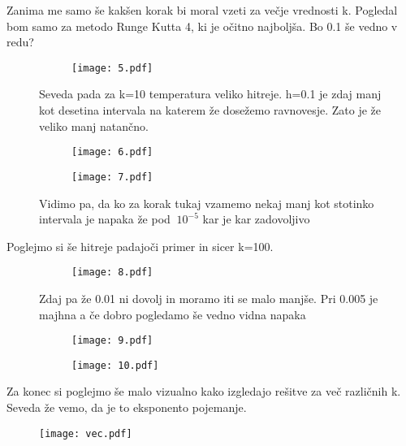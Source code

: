 \documentclass{article}
\begin{document}
Zanima me samo še kakšen korak bi moral vzeti za večje vrednosti k. Pogledal bom samo za metodo Runge Kutta 4, ki je očitno najboljša. Bo 0.1 še vedno v redu?

\begin{figure}[H]
\centering
\begin{subfigure}{.5\textwidth}
\texttt{[image: 5.pdf]}
\end{subfigure}
\caption*{Seveda pada za k=10 temperatura veliko hitreje. h=0.1 je zdaj manj kot desetina intervala na katerem že dosežemo ravnovesje. Zato je že veliko manj natančno. }
\end{figure}

\begin{figure}[H]
\begin{subfigure}{.5\textwidth}
\texttt{[image: 6.pdf]}
\end{subfigure}
\begin{subfigure}{.5\textwidth}
\texttt{[image: 7.pdf]}
\end{subfigure}
\caption*{Vidimo pa, da ko za korak tukaj vzamemo nekaj manj kot stotinko intervala je napaka že pod $~10^{-5}$ kar je kar zadovoljivo}
\end{figure}

Poglejmo si še hitreje padajoči primer in sicer k=100.

\begin{figure}[H]
\centering
\begin{subfigure}{.5\textwidth}
\texttt{[image: 8.pdf]}
\end{subfigure}
\caption*{Zdaj pa že 0.01 ni dovolj in moramo iti se malo manjše. Pri 0.005 je majhna a če dobro pogledamo še vedno vidna napaka}
\end{figure} 


\begin{figure}[H]
\begin{subfigure}{.5\textwidth}
\texttt{[image: 9.pdf]}
\end{subfigure}
\begin{subfigure}{.5\textwidth}
\texttt{[image: 10.pdf]}
\end{subfigure}
\end{figure}

Za konec si poglejmo še malo vizualno kako izgledajo rešitve za več različnih k. Seveda že vemo, da je to eksponento pojemanje.
\begin{figure}[H]
\texttt{[image: vec.pdf]}
\end{figure}
\newpage
\end{document}

